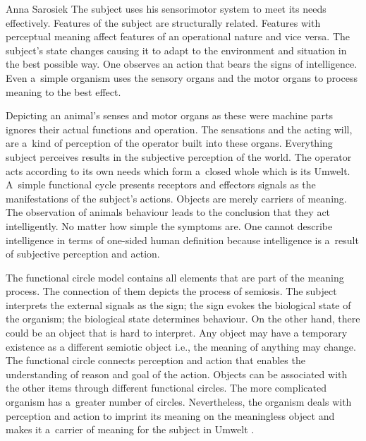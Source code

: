 \begin{artengenv}{Anna Sarosiek}
The subject uses his sensorimotor system to meet its needs effectively. Features of the subject are structurally related. Features with perceptual meaning affect features of an operational nature and vice versa. The subject’s state changes causing it to adapt to the environment and situation in the best possible way. One observes an action that bears the signs of intelligence. Even a~simple organism uses the sensory organs and the motor organs to process meaning to the best effect.

Depicting an animal’s senses and motor organs as these were machine parts ignores their actual functions and operation. The sensations and the acting will, are a~kind of perception of the operator built into these organs. Everything subject perceives results in the subjective perception of the world. The operator acts according to its own needs which form a~closed whole which is its Umwelt. A~simple functional cycle presents receptors and effectors signals as the manifestations of the subject’s actions. Objects are merely carriers of meaning. The observation of animals behaviour leads to the conclusion that they act intelligently. No matter how simple the symptoms are. One cannot describe intelligence in terms of one-sided human definition because intelligence is a~result of subjective perception and action.

The functional circle model contains all elements that are part of the meaning process. The connection of them depicts the process of semiosis. The subject interprets the external signals as the sign; the sign evokes the biological state of the organism; the biological state determines behaviour. On the other hand, there could be an object that is hard to interpret. Any object may have a temporary
existence as a different semiotic object i.e., the meaning of anything may change. The functional circle connects perception and action that enables the understanding of reason and goal of the action. Objects can be associated with the other items through different functional circles. The more complicated organism has a~greater number of circles. Nevertheless, the organism deals with perception and action to imprint its meaning on the meaningless object and makes it a~carrier of meaning for the subject in Umwelt
\parencite[][p.110]{uexkull_streifzuge_1934}.%



\end{artengenv}
